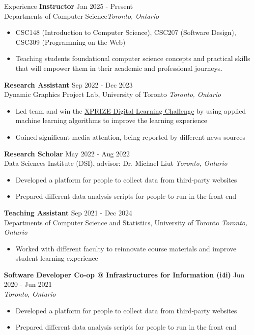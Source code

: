 \documentclass{resume} %
\begin{document}
\begin{rSection}{Experience}
    \textbf{Instructor} \hfill Jan 2025 - Present\\Departments of Computer Science\hfill \textit{Toronto, Ontario}
    \begin{itemize}
        \itemsep -3pt {} 
        \item CSC148 (Introduction to Computer Science), CSC207 (Software Design), CSC309 (Programming on the Web)
        \item Teaching students foundational computer science concepts and practical skills that will empower them in their academic and professional journeys.
    \end{itemize}
    \textbf{Research Assistant} \hfill Sep 2022 - Dec 2023\\Dynamic Graphics Project Lab, University of Toronto \hfill \textit{Toronto, Ontario}
    \begin{itemize}
        \itemsep -3pt {} 
        \item Led team and win the \href{https://www.entrepreneurship.artsci.utoronto.ca/news/cs-graduates-and-professor-awarded-grand-prize-xprize-digital-learning-challenge}{XPRIZE Digital Learning Challenge} by using applied machine learning algorithms to improve the learning experience 
        \item Gained significant media attention, being reported by different news sources
    \end{itemize}

    \textbf{Research Scholar} \hfill May 2022 - Aug 2022\\Data Sciences Institute (DSI), advisor:  Dr. Michael Liut \hfill \textit{Toronto, Ontario}
    \begin{itemize}
        \itemsep -3pt {} 
        \item Developed a platform for people to collect data from third-party websites
        \item Prepared different data analysis scripts for people to run in the front end
    \end{itemize}

    \textbf{Teaching Assistant} \hfill Sep 2021 - Dec 2024\\Departments of Computer Science and Statistics, University of Toronto \hfill \textit{Toronto, Ontario}
        \begin{itemize}
        \itemsep -3pt {} 
        \item Worked with different faculty to reinnovate course materials and improve student learning experience
    \end{itemize}
    \textbf{Software Developer Co-op @ Infrastructures for Information (i4i)} \hfill Jun 2020 - Jun 2021\\ \hfill \textit{Toronto, Ontario}
        \begin{itemize}
        \itemsep -3pt {} 
        \item Developed a platform for people to collect data from third-party websites
        \item Prepared different data analysis scripts for people to run in the front end
    \end{itemize}

\end{rSection}
\end{document}
